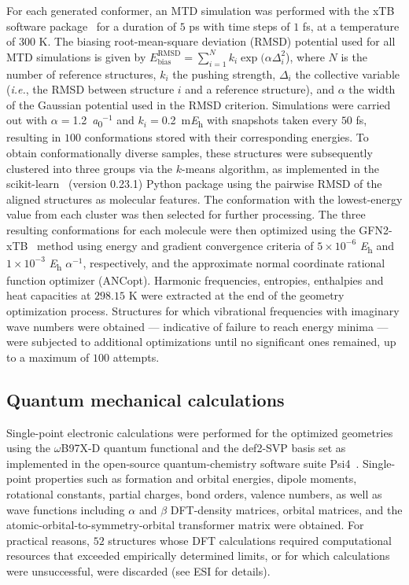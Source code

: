 For each generated conformer, an MTD simulation was performed with the xTB software package~\cite{grimme2019exploration} for a duration of $5$ ps with time steps of $1$ fs, at a temperature of $300$ K. The biasing root-mean-square deviation (RMSD) potential used for all MTD simulations is given by $E_{\mathrm{bias}}^{\mathrm{RMSD}} = \sum_{i=1}^{N} k_{i} \exp(\alpha \Delta^{2}_{i}$), where $N$ is the number of reference structures, $k_i$ the pushing strength, $\Delta_i$ the collective variable (\textit{i.e.}, the RMSD between structure $i$ and a reference structure), and $\alpha$ the width of the Gaussian potential used in the RMSD criterion. Simulations were carried out with $\alpha=$\SI{1.2}{\bohr}$^{-1}$ and $k_{i}=$\SI{0.2}{\milli\hartree} with snapshots taken every $50$ fs, resulting in $100$ conformations stored with their corresponding energies. To obtain conformationally diverse samples, these structures were subsequently clustered into three groups via the $k$-means \cite{lloyd1982least} algorithm, as implemented in the scikit-learn~\cite{scikit-learn} (version 0.23.1) Python package using the pairwise RMSD of the aligned structures as molecular features. The conformation with the lowest-energy value from each cluster was then selected for further processing. The three resulting conformations for each molecule were then optimized using the GFN2-xTB~\cite{grimme2017robust, bannwarth2019gfn2, grimme2019exploration, bannwarth2020extended} method using energy and gradient convergence criteria of $5\times 10^{-6}$ \si{\hartree} and $1\times 10^{-3}$ \si{\hartree} $\alpha^{-1}$, respectively, and the approximate normal coordinate rational function optimizer (ANCopt). Harmonic frequencies, entropies, enthalpies and heat capacities at $298.15$ K were extracted at the end of the geometry optimization process. Structures for which vibrational frequencies with imaginary wave numbers were obtained --- indicative of failure to reach energy minima --- were subjected to additional optimizations until no significant ones remained, up to a maximum of $100$ attempts. 


\subsection*{Quantum mechanical calculations}

Single-point electronic calculations were performed for the optimized geometries using the $\omega$B97X-D quantum functional and the def2-SVP basis set as implemented in the open-source quantum-chemistry software suite Psi4~\cite{smith2020psi4}. Single-point properties such as formation and orbital energies, dipole moments, rotational constants, partial charges, bond orders, valence numbers, as well as wave functions including $\alpha$ and $\beta$ DFT-density matrices, orbital matrices, and the atomic-orbital-to-symmetry-orbital transformer matrix were obtained. For practical reasons, $52$ structures whose DFT calculations required computational resources that exceeded empirically determined limits, or for which calculations were unsuccessful, were discarded (see ESI for details). 

